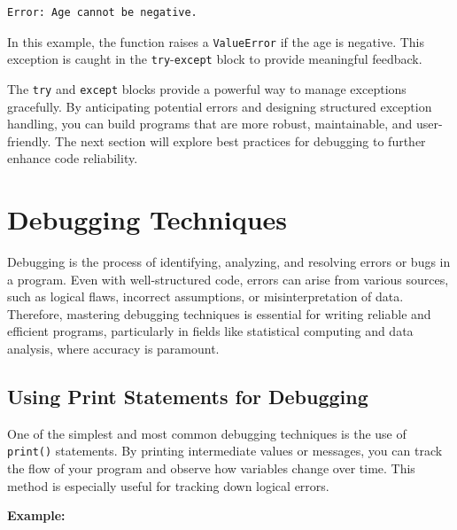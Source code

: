 \documentclass[
  letterpaper,
  DIV=11,
  numbers=noendperiod]{scrreprt}
\begin{document}
\begin{verbatim}
Error: Age cannot be negative.
\end{verbatim}

In this example, the function raises a \texttt{ValueError} if the age is
negative. This exception is caught in the \texttt{try}-\texttt{except}
block to provide meaningful feedback.

The \texttt{try} and \texttt{except} blocks provide a powerful way to
manage exceptions gracefully. By anticipating potential errors and
designing structured exception handling, you can build programs that are
more robust, maintainable, and user-friendly. The next section will
explore best practices for debugging to further enhance code
reliability.

\hypertarget{debugging-techniques}{%
\section{Debugging Techniques}\label{debugging-techniques}}

Debugging is the process of identifying, analyzing, and resolving errors
or bugs in a program. Even with well-structured code, errors can arise
from various sources, such as logical flaws, incorrect assumptions, or
misinterpretation of data. Therefore, mastering debugging techniques is
essential for writing reliable and efficient programs, particularly in
fields like statistical computing and data analysis, where accuracy is
paramount.

\hypertarget{using-print-statements-for-debugging}{%
\subsection{Using Print Statements for
Debugging}\label{using-print-statements-for-debugging}}

One of the simplest and most common debugging techniques is the use of
\texttt{print()} statements. By printing intermediate values or
messages, you can track the flow of your program and observe how
variables change over time. This method is especially useful for
tracking down logical errors.

\textbf{Example:}
\end{document}
